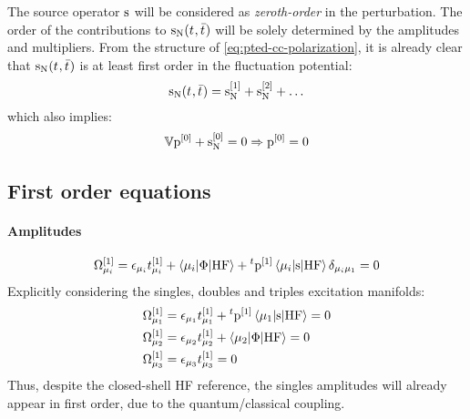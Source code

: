 The source operator $\mathrm{s}$ will be considered as \emph{zeroth-order} in
the perturbation.
The order of the contributions to $\mathrm{s}_{\mathrm{N}}(t_{},\bar{t}_{})$ will be
solely determined by the amplitudes and multipliers.
From the structure of \eqref{eq:pted-cc-polarization}, it is already
clear that $\mathrm{s}_{\mathrm{N}}(t_{},\bar{t}_{})$ is at least first order in the
fluctuation potential:
\begin{equation}
  \mathrm{s}_{\mathrm{N}}(t_{},\bar{t}_{}) =
  \mathrm{s}_{\mathrm{N}}^{[1]}
  + \mathrm{s}_{\mathrm{N}}^{[2]}
  + \ldots
\end{equation}
which also implies:
\begin{equation}
  \mathbb{V}\mathrm{p}^{[0]} + \mathrm{s}_{\mathrm{N}}^{[0]} = 0 \Rightarrow  \mathrm{p}^{[0]} = 0
\end{equation}

\subsection{First order equations}\label{sec:first-order-pt}

\paragraph*{Amplitudes}
\begin{equation}\label{eq:1st-order-amp}
  \Omega_{\mu_i}^{[1]} = \epsilon_{\mu_i}t_{\mu_i}^{[1]}
  + \braket{\mu_i | \Phi | \mathrm{HF}}
  + {}^t\mathrm{p}^{[1]}\braket{\mu_i | \mathrm{s} | \mathrm{HF}}\delta_{\mu_i\mu_1}
  = 0
\end{equation}
Explicitly considering the singles, doubles and triples excitation manifolds:
\begin{subequations}
  \begin{align}
  \Omega_{\mu_1}^{[1]} &= \epsilon_{\mu_1}t_{\mu_1}^{[1]}
  + {}^t\mathrm{p}^{[1]}\braket{\mu_1 | \mathrm{s} | \mathrm{HF}}
  = 0 \\
  \Omega_{\mu_2}^{[1]} &= \epsilon_{\mu_2}t_{\mu_2}^{[1]}
  + \braket{\mu_2 | \Phi | \mathrm{HF}}
  = 0 \\
  \Omega_{\mu_3}^{[1]} &= \epsilon_{\mu_3}t_{\mu_3}^{[1]} = 0
  \end{align}
\end{subequations}
Thus, despite the closed-shell \acs{HF} reference, the singles
amplitudes will already appear in first order, due to the
quantum/classical coupling.

